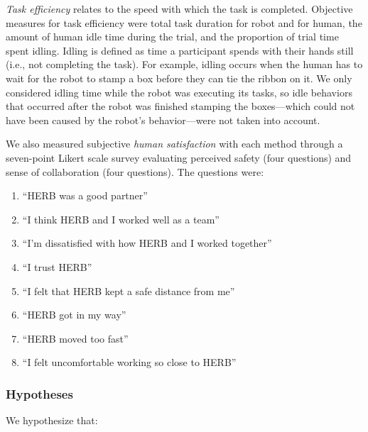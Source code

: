 \emph{Task efficiency} relates to the speed with which the task is completed. Objective measures for task efficiency were total task duration for robot and for human, the amount of human idle time during the trial, and the proportion of trial time spent idling. Idling is defined as time a participant spends with their hands still (i.e., not completing the task). For example, idling occurs when the human has to wait for the robot to stamp a box before they can tie the ribbon on it. We only considered idling time while the robot was executing its tasks, so idle behaviors that occurred after the robot was finished stamping the boxes---which could not have been caused by the robot's behavior---were not taken into account.

We also measured subjective \emph{human satisfaction} with each method through a seven-point Likert scale survey evaluating perceived safety (four questions) and sense of collaboration (four questions). The questions were:
\begin{enumerate}
  \item ``HERB was a good partner''
  \item ``I think HERB and I worked well as a team''
  \item ``I'm dissatisfied with how HERB and I worked together''
  \item ``I trust HERB''
  \item ``I felt that HERB kept a safe distance from me''
  \item ``HERB got in my way''
  \item ``HERB moved too fast''
  \item ``I felt uncomfortable working so close to HERB''
\end{enumerate}

\subsubsection{Hypotheses}

We hypothesize that:

\newhypothset





